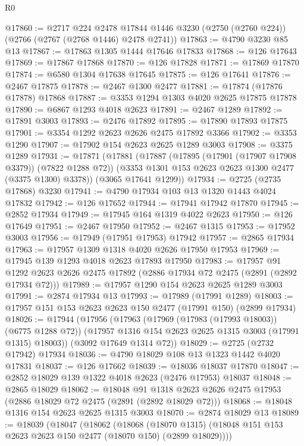 \begin{lexlean}{R0}
\begin{coremodule}
@17860 := @2717
    @224
    @2478
    @17844
    @1446
    @3230
    (@2750 (@2760 @224))
    (@2766 (@2767 (@2768 @1446) @2478 @2741))
@17863 := @4790 @3230 @85 @13
@17867 := @17863 @1305 @1444 @17646 @17833
@17868 := @126 @17643
@17869 := @17867 @17868
@17870 := @126 @17828
@17871 := @17869 @17870
@17874 := @6580 @1304 @17638 @17645
@17875 := @126 @17641
@17876 := @2467 @17875
@17878 := @2467 @1300 @2477
@17881 := @17874 (@17876 @17878) @17868
@17887 := @3353 @1294 @1303 @4020 @2625 @17875 @17878
@17890 := @6867 @1293 @4018 @2623
@17891 := @2467 @1289
@17892 := @17891 @3003
@17893 := @2476 @17892
@17895 := @17890 @17893 @17875
@17901 := @3354 @1292 @2623 @2626 @2475 @17892 @3366
@17902 := @3353 @1290
@17907 := @17902 @154 @2623 @2625 @1289 @3003
@17908 := @3375 @1289
@17931 := @17871
    (@17881
      (@17887
        (@17895 (@17901 (@17907 @17908 @3379)) (@7822 @1288 @72))
        (@3353 @1301 @153 @2623 @2623 @1300 @2477 (@3375 @1300) @3378))
      (@3065 @17641 @1299))
@17934 := @2725 (@2735 @17868) @3230
@17941 := @4790 @17934 @103 @13 @1320 @1443 @4024 @17832
@17942 := @126 @17652
@17944 := @17941 @17942 @17870
@17945 := @2852 @17934
@17949 := @17945 @164 @1319 @4022 @2623
@17950 := @126 @17649
@17951 := @2467 @17950
@17952 := @2467 @1315
@17953 := @17952 @3003
@17956 := @17949 (@17951 @17953) @17942
@17957 := @2865 @17934
@17963 := @17957 @1309 @1318 @4020 @2626 @17950 @17953
@17969 := @17945 @139 @1293 @4018 @2623 @17893 @17950
@17983 := @17957
    @91
    @1292
    @2623
    @2626
    @2475
    @17892
    (@2886 @17934 @72 @2475 (@2891 (@2892 @17934 @72)))
@17989 := @17957 @1290 @154 @2623 @2625 @1289 @3003
@17991 := @2874 @17934 @13
@17993 := @17989 (@17991 @1289)
@18003 := @17957 @151 @153 @2623 @2623 @150 @2477 (@17991 @150) (@2899 @17934)
@18026 := @17944
    (@17956
      (@17963
        (@17969 (@17983 (@17993 @18003)) (@6775 @1288 @72))
        (@17957 @1316 @154 @2623 @2625 @1315 @3003 (@17991 @1315) @18003))
      (@3092 @17649 @1314 @72))
@18029 := @2725 (@2732 @17942) @17934
@18036 := @4790 @18029 @108 @13 @1323 @1442 @4020 @17831
@18037 := @126 @17662
@18039 := @18036 @18037 @17870
@18047 := @2852 @18029 @139 @1322 @4018 @2623 (@2476 @17953) @18037
@18048 := @2865 @18029
@18062 := @18048
    @91
    @1318
    @2623
    @2626
    @2475
    @17953
    (@2886 @18029 @72 @2475 (@2891 (@2892 @18029 @72)))
@18068 := @18048 @1316 @154 @2623 @2625 @1315 @3003
@18070 := @2874 @18029 @13
@18089 := @18039
    (@18047
      (@18062
        (@18068
          (@18070 @1315)
          (@18048 @151 @153 @2623 @2623 @150 @2477 (@18070 @150) (@2899 @18029))))

\end{coremodule}
\end{lexlean}
